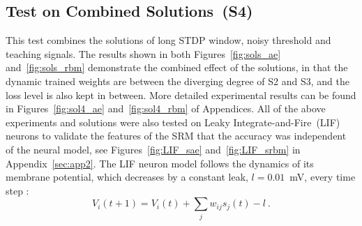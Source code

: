 \subsection{Test on Combined Solutions~(S4)}
This test combines the solutions of long STDP window, noisy threshold and teaching signals.
The results shown in both Figures~\ref{fig:sols_ae} and~\ref{fig:sols_rbm} demonstrate the combined effect of the solutions, in that the dynamic trained weights are between the diverging degree of S2 and S3, and the loss level is also kept in between.
More detailed experimental results can be found in Figures~\ref{fig:sol4_ae} and~\ref{fig:sol4_rbm} of Appendices.
All of the above experiments and solutions were also tested on Leaky Integrate-and-Fire~(LIF) neurons to validate the features of the SRM that the accuracy was independent of the neural model, see Figures~\ref{fig:LIF_sae} and~\ref{fig:LIF_srbm} in Appendix~\ref{sec:app2}.
The LIF neuron model follows the dynamics of its membrane potential, which decreases by a constant leak, $l=0.01$~mV, every time step :
\begin{equation}
V_i(t+1)=V_i(t) + \sum_j w_{ij} s_j(t) - l~.
\end{equation}
